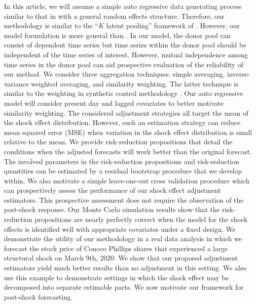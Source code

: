 \documentclass[11pt]{article}
\theoremstyle{definition}
\begin{document}
In this article, we will assume a simple auto regressive data generating process similar to that in \citet{blundell1998initial} with a general random effects structure. Therefore, our methodology is similar to the ``$K$ latent pooling'' framework of \cite{ramaswamy1993empirical}. However, our model formulation is more general than \cite{ramaswamy1993empirical}. In our model, the donor pool can consist of dependent time series but time series within the donor pool should be independent of the time series of interest. However, mutual independence among time series in the donor pool can aid prospective evaluation of the reliability of our method. 
We consider three aggregation techniques: simple averaging, inverse-variance weighted averaging, and similarity weighting. The latter technique is similar to the weighting in synthetic control methodology \citep{abadie2010synthetic}. Our auto regressive model will consider present day and lagged covariates to better motivate similarity weighting. The considered adjustment strategies all target the mean of the shock effect distribution. However, such an estimation strategy can reduce mean squared error (MSE) when variation in the shock effect distribution is small relative to the mean. We provide risk-reduction propositions that detail the conditions when the adjusted forecasts will work better than the original forecast. The involved parameters in the risk-reduction propositions and risk-reduction quantities can be estimated by a residual bootstrap procedure that we develop within. %
We also motivate a simple leave-one-out cross validation procedure which can prospectively assess the performance of our shock effect adjustment estimators. This prospective assessment does not require the observation of the post-shock response. Our Monte Carlo simulation results show that the risk-reduction propositions are nearly perfectly correct when the model for the shock effects is identified well with appropriate covariates under a fixed design. We demonstrate the utility of our methodology in a real data analysis in which we forecast the stock price of Conoco Phillips shares that experienced a large structural shock on March 9th, 2020. We show that our proposed adjustment estimators yield much better results than no adjustment in this setting. We also use this example to demonstrate settings in which the shock effect may be decomposed into separate estimable parts. We now motivate our framework for post-shock forecasting.
\end{document}
